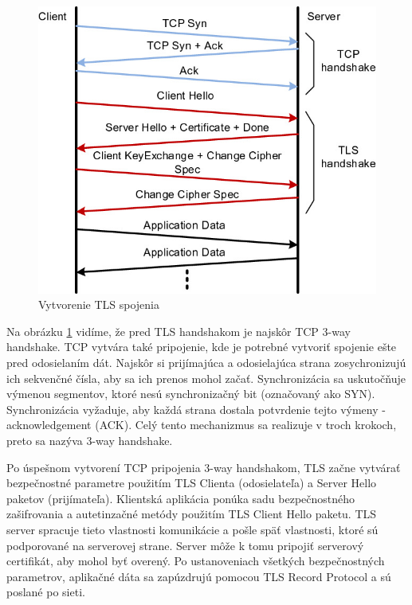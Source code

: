  \begin{figure}[!ht]
 \includegraphics[width=1\textwidth]{obrazky-figures/tcp_tls.png}
\caption{Vytvorenie TLS spojenia\cite{ja3}}
\centering
\label{tcp_handshake}
\end{figure}
 Na obrázku \ref{tcp_handshake} vidíme, že pred TLS handshakom je najskôr TCP 3-way handshake. TCP vytvára také pripojenie, kde je potrebné vytvoriť spojenie ešte pred odosielaním dát. Najskôr si prijímajúca a odosielajúca strana zosychronizujú ich sekvenčné čísla, aby sa ich prenos mohol začať. Synchronizácia sa uskutočňuje výmenou segmentov, ktoré nesú synchronizačný bit (označovaný ako SYN). Synchronizácia vyžaduje, aby každá strana dostala potvrdenie tejto výmeny - acknowledgement (ACK). Celý tento mechanizmus sa realizuje v troch krokoch, preto sa nazýva 3-way handshake.\cite{trnav}\par
Po úspešnom vytvorení TCP pripojenia 3-way handshakom, TLS začne vytvárať bezpečnostné parametre použitím TLS Clienta (odosielateľa) a Server Hello paketov (prijímateľa). Klientská aplikácia ponúka sadu bezpečnostného zašifrovania a autetinzačné metódy použitím TLS Client Hello paketu. TLS server spracuje tieto vlastnosti komunikácie a pošle späť vlastnosti, ktoré sú podporované na serverovej strane. Server môže k tomu pripojiť serverový certifikát, aby mohol byť overený. Po ustanoveniach všetkých bezpečnostných parametrov, aplikačné dáta sa zapúzdrujú pomocou TLS Record Protocol a sú poslané po sieti.\cite{ja3}\par

